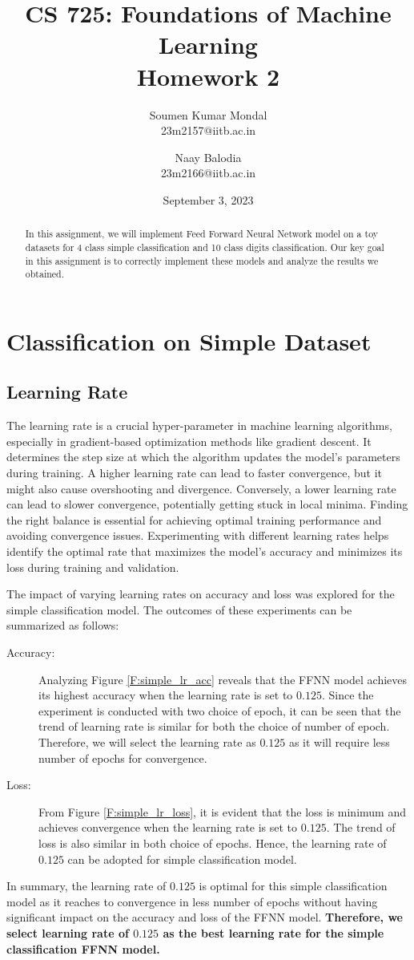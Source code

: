 \documentclass[12pt, a4paper, twoside]{article}
\title{\vspace{-0.5in}\textbf{CS 725: Foundations of Machine Learning \\
Homework 2}}
\author{Soumen Kumar Mondal\\
23m2157@iitb.ac.in \and
Naay Balodia\\
23m2166@iitb.ac.in}
\date{September  3, 2023}
\begin{document}
\maketitle
\thispagestyle{fancy}
\begin{abstract}
In this assignment, we will implement Feed Forward Neural Network model on a toy datasets for 4 class simple classification and 10 class digits classification. Our key goal in this assignment is to correctly implement these models and analyze the results we obtained.
\end{abstract}
\section{Classification on Simple Dataset}\label{S:simple}
\subsection{Learning Rate}\label{SS:simple-lr}
The learning rate is a crucial hyper-parameter in machine learning algorithms, especially in gradient-based optimization methods like gradient descent. It determines the step size at which the algorithm updates the model's parameters during training. A higher learning rate can lead to faster convergence, but it might also cause overshooting and divergence. Conversely, a lower learning rate can lead to slower convergence, potentially getting stuck in local minima. Finding the right balance is essential for achieving optimal training performance and avoiding convergence issues. Experimenting with different learning rates helps identify the optimal rate that maximizes the model's accuracy and minimizes its loss during training and validation.
\par
The impact of varying learning rates on accuracy and loss was explored for the simple classification model. The outcomes of these experiments can be summarized as follows:
\begin{description}
\item[Accuracy:] Analyzing Figure \ref{F:simple_lr_acc} reveals that the FFNN model achieves its highest accuracy when the learning rate is set to $0.125$. Since the experiment is conducted with two choice of epoch, it can be seen that the trend of learning rate is similar for both the choice of number of epoch. Therefore, we will select the learning rate as $0.125$ as it will require less number of epochs for convergence.
\item[Loss:] From Figure \ref{F:simple_lr_loss}, it is evident that the loss is minimum and achieves convergence when the learning rate is set to $0.125$. The trend of loss is also similar in both choice of epochs. Hence, the learning rate of $0.125$ can be adopted for simple classification model.
\end{description}
\par
In summary, the learning rate of $0.125$ is optimal for this simple classification model as it reaches to convergence in less number of epochs without having significant impact on the accuracy and loss of the FFNN model. \textbf{Therefore, we select learning rate of $0.125$ as the best learning rate for the simple classification FFNN model.}
\end{document}
